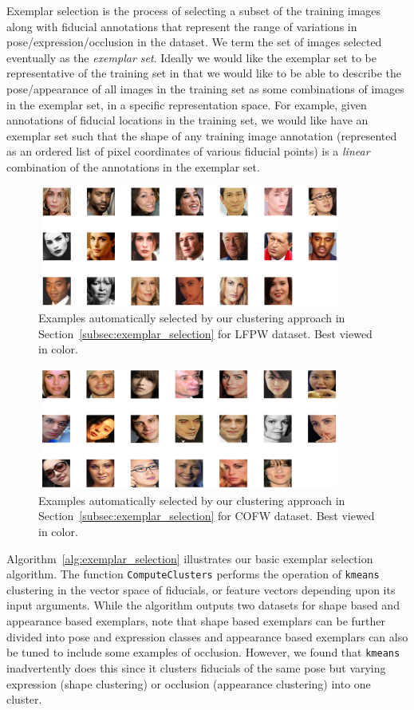 \label{subsec:exemplar_selection}

Exemplar selection is the process of selecting a subset of the training images along with
fiducial annotations that represent the range of variations in pose/expression/occlusion in the 
dataset. We term the set of images selected eventually as the \emph{exemplar set}. Ideally we would
like the exemplar set to be representative of the training set in that we would like to be able
to describe the pose/appearance of all images in the training set as some combinations of images
in the exemplar set, in a specific representation space. For example, given annotations of fiducial
locations in the training set, we would like have an exemplar set such that the shape of any training image
annotation (represented as an ordered list of pixel coordinates of various fiducial points) 
is a \emph{linear} combination of the annotations in the exemplar set.

\begin{figure}[!ht]
  \centering
  \includegraphics[width=10cm,height=4cm]{fid/figures/lfpw_exemplars_selected2.png}
  \caption{Examples automatically selected by our clustering approach in
  Section~\ref{subsec:exemplar_selection} for LFPW dataset. Best viewed in color.}
  \label{fig:cofw_lfpw_exemplars}
\end{figure}
\begin{figure}[!ht]
  \centering
  \includegraphics[width=10cm,height=4cm]{fid/figures/cofw_exemplars_selected2.png}
  \caption{Examples automatically selected by our clustering approach in
  Section~\ref{subsec:exemplar_selection} for COFW dataset. Best viewed in color.}
  \label{fig:cofw_exemplars}
\end{figure}

Algorithm~\ref{alg:exemplar_selection} illustrates our basic exemplar selection algorithm.
The function \texttt{ComputeClusters} performs the operation of \texttt{kmeans} clustering in the
vector space of fiducials, or feature vectors depending upon its input arguments.
While the algorithm outputs two datasets for shape based and appearance based exemplars, note
that shape based exemplars can be further divided into pose and expression classes and
appearance based exemplars can also be tuned to include some examples of occlusion.
However, we found that \texttt{kmeans} inadvertently does this since it clusters fiducials
of the same pose but varying expression (shape clustering) or occlusion (appearance
clustering) into one cluster.

